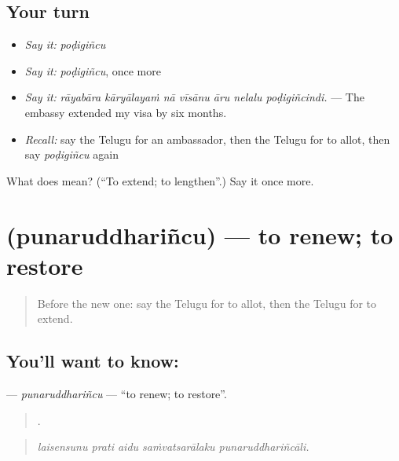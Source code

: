 \subsection*{Your turn}
\begin{itemize}
\raggedright
  \item \emph{Say it:} \emph{poḍigiñcu}
  \item \emph{Say it:} \emph{poḍigiñcu}, once more
  \item \emph{Say it:} \emph{rāyabāra kāryālayaṁ nā vīsānu āru nelalu poḍigiñcindi.} — The embassy extended my visa by six months.
  \item \emph{Recall:} say the Telugu for an ambassador, then the Telugu for to allot, then say \emph{poḍigiñcu} again
\end{itemize}

\begin{tcolorbox}[breakable,colback=teal!4,colframe=teal!35!black,title={Before you move on}]
What does  mean? (\textquotedblleft{}To extend; to lengthen\textquotedblright{}.) Say it once more.
\end{tcolorbox}
\section[\texorpdfstring{\te{పునరుద్ధరించు} (punaruddhariñcu)}{పునరుద్ధరించు (punaruddhariñcu)}]{ (punaruddhariñcu) — to renew; to restore}

\label{lesson:TE-C463-punaruddharincu}



\begin{quote}
Before the new one: say the Telugu for to allot, then the Telugu for to extend.
\end{quote}

\subsection*{You'll want to know: }
\textbf{} — \emph{punaruddhariñcu} — \textquotedblleft{}to renew; to restore\textquotedblright{}.

\begin{quote}
    .
\end{quote}

\begin{quote}
\emph{laisensunu prati aidu saṁvatsarālaku punaruddhariñcāli.}
\end{quote}

